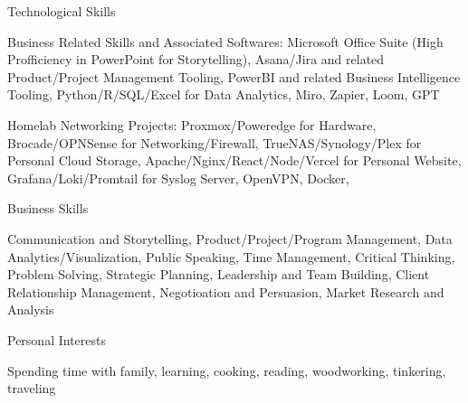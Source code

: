 

\begin{cventries}

  \cventry
    {Technological Skills} %
    {} %
    {} %
    {} %
    {
      \begin{cvitems} %
        \item {Business Related Skills and Associated Softwares: Microsoft Office Suite (High Profficiency in PowerPoint for Storytelling), Asana/Jira and related Product/Project Management Tooling, PowerBI and related Business Intelligence Tooling, Python/R/SQL/Excel for Data Analytics, Miro, Zapier, Loom, GPT}
        \item {Homelab Networking Projects: Proxmox/Poweredge for Hardware, Brocade/OPNSense for Networking/Firewall, TrueNAS/Synology/Plex for Personal Cloud Storage, Apache/Nginx/React/Node/Vercel for Personal Website, Grafana/Loki/Promtail for Syslog Server, OpenVPN, Docker, }
      \end{cvitems}
    }

  \cventry
    {Business Skills} %
    {} %
    {} %
    {} %
    {
      \begin{cvitems} %
        \item {Communication and Storytelling, Product/Project/Program Management, Data Analytics/Visualization, Public Speaking, Time Management, Critical Thinking, Problem Solving, Strategic Planning, Leadership and Team Building, Client Relationship Management, Negotioation and Persuasion, Market Research and Analysis}
      \end{cvitems}
    }

  \cventry
    {Personal Interests} %
    {} %
    {} %
    {} %
    {
      \begin{cvitems} %
        \item {Spending time with family, learning, cooking, reading, woodworking, tinkering, traveling}
      \end{cvitems}
    }


\end{cventries}
